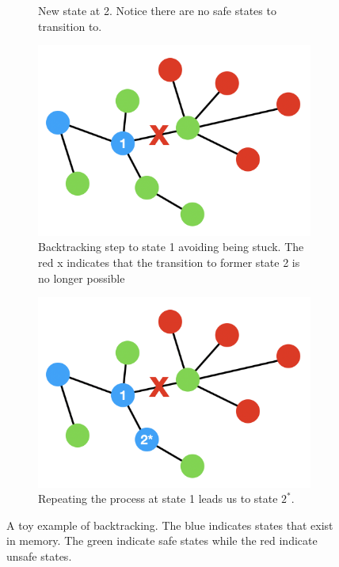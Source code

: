 \documentclass[acmsmall,review,authorversion]{acmart}
\begin{document}
\begin{figure}[htb]
\begin{subfigure}{.5\textwidth}
          \caption{New state at 2. Notice there are no safe states to transition to.}
          \label{fig:ex2}
        \end{subfigure}
        \begin{subfigure}{.5\textwidth}
          \centering
          \includegraphics[width=.8\linewidth]{assets/example_3.png}
          \caption{Backtracking step to state 1 avoiding being stuck. The red x indicates that the transition to former state 2 is no longer possible}
          \label{fig:ex3}
        \end{subfigure}%
        \begin{subfigure}{.5\textwidth}
          \centering
          \includegraphics[width=.8\linewidth]{assets/example_4.png}
          \caption{Repeating the process at state 1 leads us to state $2^*$.}
          \label{fig:ex4}
        \end{subfigure}
        \captionsetup{justification=centering}
        \caption{A toy example of backtracking. The blue indicates states that exist in memory. The green indicate safe states while the red indicate unsafe states.}
        \label{fig:example_system}
    \end{figure}
    
\end{document}
